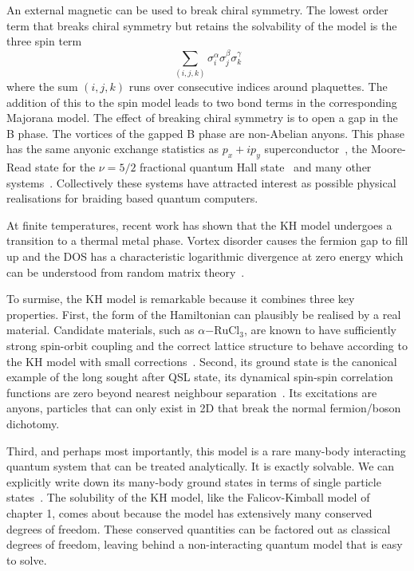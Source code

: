 An external magnetic can be used to break chiral symmetry. The lowest order term that breaks chiral symmetry but retains the solvability of the model is the three spin term \[
\sum_{(i,j,k)} \sigma_i^{\alpha} \sigma_j^{\beta} \sigma_k^{\gamma}
\] where the sum \((i,j,k)\) runs over consecutive indices around plaquettes. The addition of this to the spin model leads to two bond terms in the corresponding Majorana model. The effect of breaking chiral symmetry is to open a gap in the B phase. The vortices of the gapped B phase are non-Abelian anyons. This phase has the same anyonic exchange statistics as \(p_x + ip_y\) superconductor~\autocite{readPairedStatesFermions2000}, the Moore-Read state for the \(\nu = 5/2\) fractional quantum Hall state~\autocite{mooreNonabelionsFractionalQuantum1991} and many other systems~\autocite{aliceaNonAbelianStatisticsTopological2011,fuSuperconductingProximityEffect2008,lutchynMajoranaFermionsTopological2010,oregHelicalLiquidsMajorana2010,sauGenericNewPlatform2010}. Collectively these systems have attracted interest as possible physical realisations for braiding based quantum computers.

At finite temperatures, recent work has shown that the KH model undergoes a transition to a thermal metal phase. Vortex disorder causes the fermion gap to fill up and the DOS has a characteristic logarithmic divergence at zero energy which can be understood from random matrix theory~\autocite{selfThermallyInducedMetallic2019}.

To surmise, the KH model is remarkable because it combines three key properties. First, the form of the Hamiltonian can plausibly be realised by a real material. Candidate materials, such as \(\alpha\mathrm{-RuCl}_3\), are known to have sufficiently strong spin-orbit coupling and the correct lattice structure to behave according to the KH model with small corrections~\autocite{banerjeeProximateKitaevQuantum2016,TrebstPhysRep2022}. Second, its ground state is the canonical example of the long sought after QSL state, its dynamical spin-spin correlation functions are zero beyond nearest neighbour separation~\autocite{baskaranExactResultsSpin2007}. Its excitations are anyons, particles that can only exist in 2D that break the normal fermion/boson dichotomy.

Third, and perhaps most importantly, this model is a rare many-body interacting quantum system that can be treated analytically. It is exactly solvable. We can explicitly write down its many-body ground states in terms of single particle states~\autocite{kitaevAnyonsExactlySolved2006}. The solubility of the KH model, like the Falicov-Kimball model of chapter 1, comes about because the model has extensively many conserved degrees of freedom. These conserved quantities can be factored out as classical degrees of freedom, leaving behind a non-interacting quantum model that is easy to solve.
